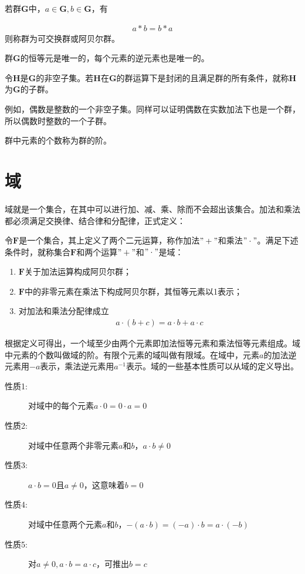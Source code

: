 若群$\mathbf{G}$中，$a\in\mathbf{G},b\in\mathbf{G}$，有

\begin{eqnarray}
a*b=b*a  
  \label{equ:2.5}
\end{eqnarray}
则称群为可交换群或阿贝尔群。
\begin{ioatheorem}
  群$\mathbf{G}$的恒等元是唯一的，每个元素的逆元素也是唯一的。
  \label{theorem:2.1}
\end{ioatheorem}
\begin{ioatheorem}
  令$\mathbf{H}$是$\mathbf{G}$的非空子集。若$\mathbf{H}$在$\mathbf{G}$的群运算下是封闭的且满足群的所有条件，就称$\mathbf{H}$为$\mathbf{G}$的子群。
  \label{theorem:2.2}
\end{ioatheorem}
例如，偶数是整数的一个非空子集。同样可以证明偶数在实数加法下也是一个群，所以偶数时整数的一个子群。
\begin{ioatheorem}
  群中元素的个数称为群的阶。
  \label{theorem:2.3}
\end{ioatheorem}
\section{域\cite{JINSHIDAISHU}}
域就是一个集合，在其中可以进行加、减、乘、除而不会超出该集合。加法和乘法都必须满足交换律、结合律和分配律，正式定义：
\begin{ioadefine}
  令$\mathbf{F}$是一个集合，其上定义了两个二元运算，称作加法$"+"$和乘法$"\cdot"$。满足下述条件时，就称集合$\mathbf{F}$和两个运算$"+"$和$"\cdot"$是域：
  \begin{enumerate}
    \item $\mathbf{F}$关于加法运算构成阿贝尔群；
    \item $\mathbf{F}$中的非零元素在乘法下构成阿贝尔群，其恒等元素以1表示；
    \item 对加法和乘法分配律成立
      \begin{eqnarray}
     a\cdot(b+c)=a\cdot b+a\cdot c     
        \label{equ:2.6}
      \end{eqnarray}
  \end{enumerate}
\end{ioadefine}
根据定义可得出，一个域至少由两个元素即加法恒等元素和乘法恒等元素组成。域中元素的个数叫做域的阶。有限个元素的域叫做有限域。在域中，元素$a$的加法逆元素用$-a$表示，乘法逆元素用$a^{-1}$表示。域的一些基本性质可以从域的定义导出。
\begin{description}
  \item [性质1:~]对域中的每个元素$a\cdot 0=0\cdot a=0$
  \item [性质2:~]对域中任意两个非零元素$a$和$b$，$a\cdot b\neq 0$
  \item [性质3:~]$a\cdot b=0$且$a\neq 0$，这意味着$b=0$
  \item [性质4:~]对域中任意两个元素$a$和$b$，$-(a\cdot
    b)=(-a)\cdot b=a\cdot (-b)$
  \item [性质5:~]对$a\neq 0,a\cdot b=a\cdot c$，可推出$b=c$
\end{description}

